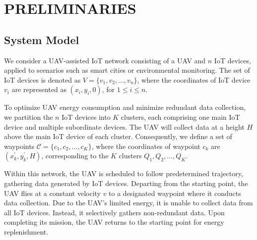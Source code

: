 \documentclass[sigconf]{acmart}
\begin{document}
\section{PRELIMINARIES}
\subsection{System Model}

We consider a UAV-assisted IoT network consisting of a UAV and $n$ IoT devices, applied to scenarios such as smart cities or environmental monitoring. The set of IoT devices is denoted as $V=\{v_1,v_2,\ldots,v_n\}$, where the coordinates of IoT device $v_i$ are represented as $(x_i,y_i,0)$, for $1 \leq i \leq n$.

To optimize UAV energy consumption and minimize redundant data collection, we partition the $n$ IoT devices into $K$ clusters, each comprising one main IoT device and multiple subordinate devices. The UAV will collect data at a height $H$ above the main IoT device of each cluster. Consequently, we define a set of waypoints $\mathcal{C}=\{c_1,c_2,\ldots,c_K\}$, where the coordinates of waypoint $c_k$  are $(x_{k}^{'},y_{k}^{'},H)$, corresponding to the $K$ clusters $Q_1,Q_2,\ldots,Q_{K}$.



Within this network, the UAV is scheduled to follow predetermined trajectory, gathering data generated by IoT devices. Departing from the starting point, the UAV flies at a constant velocity $v$ to a designated waypoint where it conducts data collection. Due to the UAV's limited energy, it is unable to collect data from all IoT devices. Instead, it selectively gathers non-redundant data. Upon completing its mission, the UAV returns to the starting point for energy replenishment.
\end{document}
